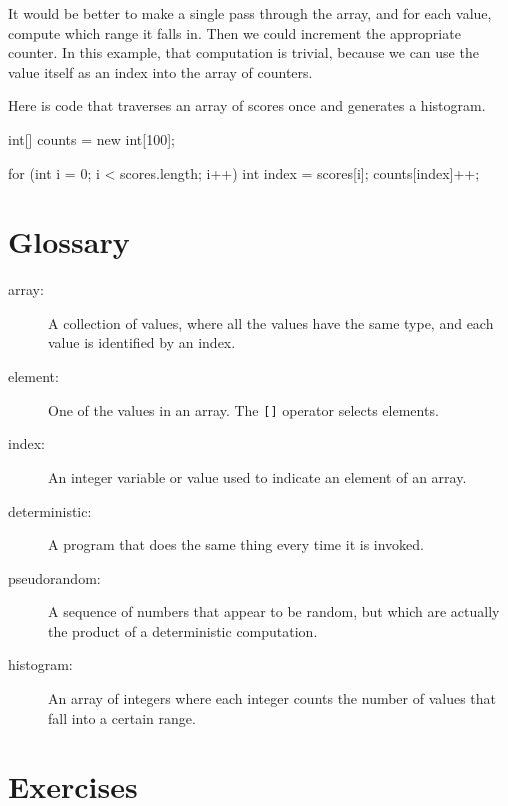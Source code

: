 It would be better to make a single pass through the array,
and for each value, compute which range it falls in.  Then
we could increment the appropriate counter.
In this example, that computation is trivial, because we
can use the value itself as an index into the array of counters.

Here is code that traverses an array of scores once and generates
a histogram.

\begin{code}
    int[] counts = new int[100];

    for (int i = 0; i < scores.length; i++) {
        int index = scores[i];
        counts[index]++;
    }
\end{code}


\section{Glossary}

\begin{description}

\item[array:]  A collection of values, where all the
values have the same type, and each value is identified by
an index.

\item[element:]  One of the values in an array.  The {\tt []}
operator selects elements.

\item[index:]  An integer variable or value used to indicate
an element of an array.

\item[deterministic:]  A program that does the same thing every
time it is invoked.

\item[pseudorandom:]  A sequence of numbers that appear to be
random, but which are actually the product of a deterministic
computation.

\item[histogram:]  An array of integers where each integer
counts the number of values that fall into a certain range.


\end{description}


\section{Exercises}

